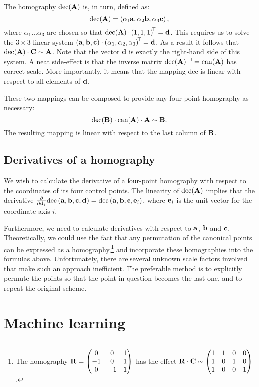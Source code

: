 The homography $\mathrm{dec}(\mathbf{A})$ is, in turn, defined as:
$$\mathrm{dec}(\mathbf{A}) = \left( \alpha_1 \mathbf{a}, \alpha_2 \mathbf{b}, \alpha_3 \mathbf{c} \right),$$
where $\alpha_1 \dots \alpha_3$ are chosen so that $\mathrm{dec}(\mathbf{A}) \cdot \left( 1, 1, 1 \right)^{\!\mathsf{T}} = \mathbf{d}$.
This requires us to solve the $3 \times 3$ linear system $\left(\mathbf{a}, \mathbf{b}, \mathbf{c} \right) \cdot \left(\alpha_1, \alpha_2, \alpha_3 \right) ^{\!\mathsf{T}} = \mathbf{d}$.
As a result it follows that $\mathrm{dec}(\mathbf{A}) \cdot \mathbf{C} \sim \mathbf{A}$.
Note that the vector $\mathbf{d}$ is exactly the right-hand side of this system.
A neat side-effect is that the inverse matrix $\mathrm{dec}(\mathbf{A}) ^{-\mathsf{I}} = \mathrm{can}(\mathbf{A})$ has correct scale. 
More importantly, it means that the mapping $\mathrm{dec}$ is linear with respect to all elements of $\mathbf{d}$.

These two mappings can be composed to provide any four-point homography as necessary:
$$\mathrm{dec}(\mathbf{B}) \cdot \mathrm{can}(\mathbf{A}) \cdot \mathbf{A} \sim \mathbf{B}.$$
The resulting mapping is linear with respect to the last column of $\mathbf{B}$.


\subsection{Derivatives of a homography}
\label{s.homderivatives}

We wish to calculate the derivative of a four-point homography with respect to the coordinates of its four control points.
The linearity of $\mathrm{dec}(\mathbf{A})$ implies that the derivative $\frac{\partial} {\partial \mathbf{d}_i} \mathrm{dec} \left( \mathbf{a}, \mathbf{b}, \mathbf{c}, \mathbf{d} \right) = \mathrm{dec} \left( \mathbf{a}, \mathbf{b}, \mathbf{c}, \mathbf{e}_i \right)$, where $\mathbf{e}_i$ is the unit vector for the coordinate axis $i$.

Furthermore, we need to calculate derivatives with respect to $\mathbf{a}$, $\mathbf{b}$ and $\mathbf{c}$.
Theoretically, we could use the fact that any permutation of the canonical points can be expressed as a homography,\footnote{
The homography $\mathbf{R} = \begin{pmatrix}
 0 & 0 & 1 \\
 -1 & 0 & 1 \\
 0 & -1 & 1
 \end{pmatrix}$ has the effect $\mathbf{R} \cdot \mathbf{C} \sim \begin{pmatrix}
 1 & 1 & 0 & 0 \\
 1 & 0 & 1 & 0 \\
 1 & 0 & 0 & 1
 \end{pmatrix}$.
} and incorporate these homographies into the formulas above.
Unfortunately, there are several unknown scale factors involved that make such an approach inefficient.
The preferable method is to explicitly permute the points so that the point in question becomes the last one, and to repeat the original scheme.


\section{Machine learning}

